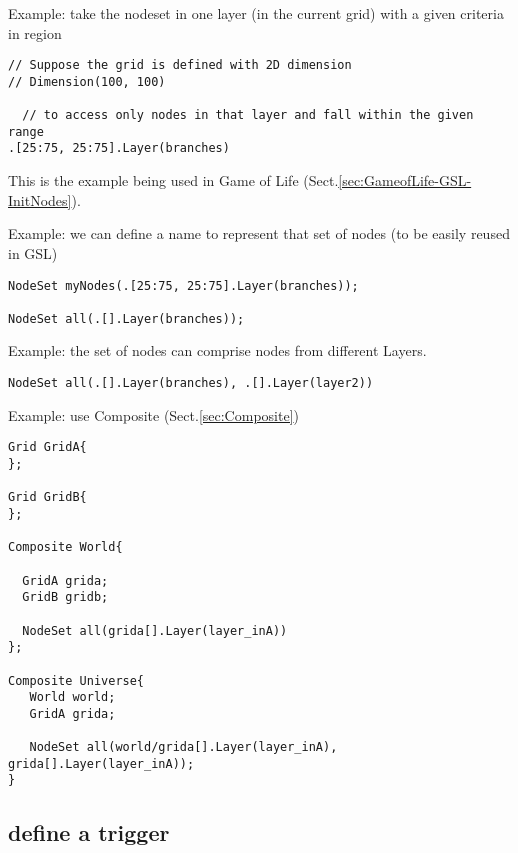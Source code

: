 Example: take the nodeset in one layer (in the current grid) with a given
criteria in region
\begin{verbatim}
// Suppose the grid is defined with 2D dimension
// Dimension(100, 100)

  // to access only nodes in that layer and fall within the given range 
.[25:75, 25:75].Layer(branches)
\end{verbatim}
This is the example being used in Game of Life
(Sect.\ref{sec:GameofLife-GSL-InitNodes}).

Example: we can define a name to represent that set of nodes (to be easily
reused in GSL)
\begin{verbatim}
NodeSet myNodes(.[25:75, 25:75].Layer(branches));

NodeSet all(.[].Layer(branches));
\end{verbatim}


Example: the set of nodes can comprise nodes from different Layers. 
\begin{verbatim}
NodeSet all(.[].Layer(branches), .[].Layer(layer2))
\end{verbatim}

Example: use Composite (Sect.\ref{sec:Composite})
\begin{verbatim}
Grid GridA{
};

Grid GridB{
};

Composite World{

  GridA grida;
  GridB gridb;
  
  NodeSet all(grida[].Layer(layer_inA))
};

Composite Universe{
   World world;
   GridA grida;
   
   NodeSet all(world/grida[].Layer(layer_inA), grida[].Layer(layer_inA));
}
\end{verbatim}

\subsection{define a trigger}
\label{sec:trigger-define-in-GSL}

